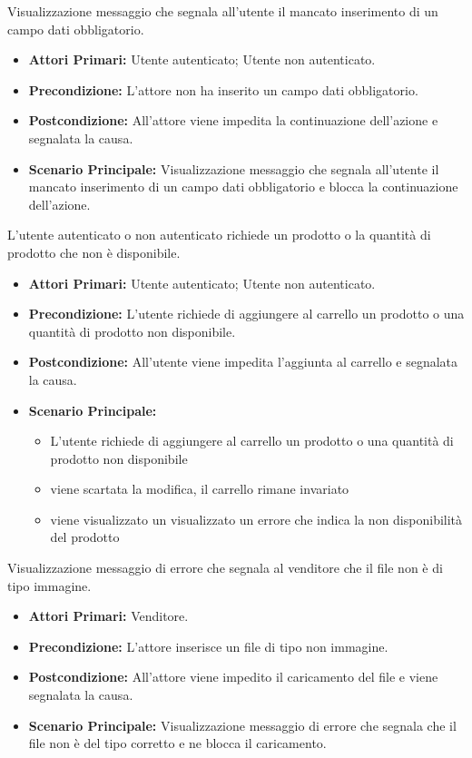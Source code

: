 Visualizzazione messaggio che segnala all'utente il mancato inserimento di un campo dati obbligatorio.
\begin{itemize}
    \item \textbf{Attori Primari:} Utente autenticato; Utente non autenticato.
    \item \textbf{Precondizione:} L'attore non ha inserito un campo dati obbligatorio.
    \item \textbf{Postcondizione:} All'attore viene impedita la continuazione dell'azione e segnalata la causa.
    \item \textbf{Scenario Principale:} Visualizzazione messaggio che segnala all'utente il mancato inserimento di un campo dati obbligatorio e blocca la continuazione dell'azione.
\end{itemize}

L'utente autenticato o non autenticato richiede un prodotto o la quantità di prodotto che non è disponibile.
\begin{itemize}
    \item \textbf{Attori Primari:} Utente autenticato; Utente non autenticato.
    \item \textbf{Precondizione:} L'utente richiede di aggiungere al carrello un prodotto o una quantità di prodotto non disponibile. 
    \item \textbf{Postcondizione:} All'utente viene impedita l'aggiunta al carrello e segnalata la causa.
    \item \textbf{Scenario Principale:}
        \begin{itemize}
            \item L'utente richiede di aggiungere al carrello un prodotto o una quantità di prodotto non disponibile
            \item viene scartata la modifica, il carrello rimane invariato
            \item viene visualizzato un visualizzato un errore che indica la non disponibilità del prodotto
        \end{itemize}
\end{itemize}

Visualizzazione messaggio di errore che segnala al venditore che il file non è di tipo immagine.
\begin{itemize}
    \item \textbf{Attori Primari:} Venditore.
    \item \textbf{Precondizione:} L'attore inserisce un file di tipo non immagine.
    \item \textbf{Postcondizione:} All'attore viene impedito il caricamento del file e viene segnalata la causa.
    \item \textbf{Scenario Principale:} Visualizzazione messaggio di errore che segnala che il file non è del tipo corretto e ne blocca il caricamento.
\end{itemize}

